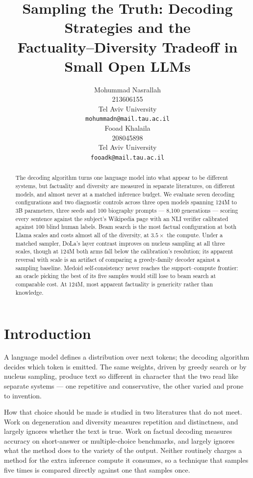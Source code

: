 \documentclass[11pt]{article}
\title{Sampling the Truth: Decoding Strategies and the\\
       Factuality--Diversity Tradeoff in Small Open LLMs}
\author{Mohummad Nasrallah \\
  213606155 \\
  Tel Aviv University \\
  \texttt{mohummadn@mail.tau.ac.il} \\\And
  Fooad Khalaila \\
  208045898 \\
  Tel Aviv University \\
  \texttt{fooadk@mail.tau.ac.il} \\}
\begin{document}
\maketitle

\begin{abstract}
The decoding algorithm turns one language model into what appear to be
different systems, but factuality and diversity are measured in separate
literatures, on different models, and almost never at a matched inference
budget. We evaluate seven decoding configurations and two diagnostic controls
across three open models spanning 124M to 3B parameters, three seeds and 100
biography prompts --- 8{,}100 generations --- scoring every sentence against
the subject's Wikipedia page with an NLI verifier calibrated against 100 blind
human labels. Beam search is the most factual configuration at both Llama scales
and costs almost all of the diversity, at $3.5\times$ the compute. Under a matched sampler, DoLa's
layer contrast improves on nucleus sampling at all three scales, though at
124M both arms fall below the calibration's resolution; its apparent reversal
with scale is an artifact of comparing a greedy-family decoder against a
sampling baseline.
Medoid self-consistency never reaches the support--compute frontier: an oracle
picking the best of its five samples would still lose to beam search at
comparable cost.
At 124M, most apparent factuality is genericity rather than knowledge.
\end{abstract}

\section{Introduction}

A language model defines a distribution over next tokens; the decoding
algorithm decides which token is emitted. The same weights, driven by greedy
search or by nucleus sampling, produce text so different in character that the
two read like separate systems --- one repetitive and conservative, the other
varied and prone to invention.

How that choice should be made is studied in two literatures that do not meet.
Work on degeneration and diversity measures repetition and distinctness, and
largely ignores whether the text is true. Work on factual decoding measures
accuracy on short-answer or multiple-choice benchmarks, and largely ignores
what the method does to the variety of the output. Neither routinely charges a
method for the extra inference compute it consumes, so a technique that samples
five times is compared directly against one that samples once.
\end{document}
